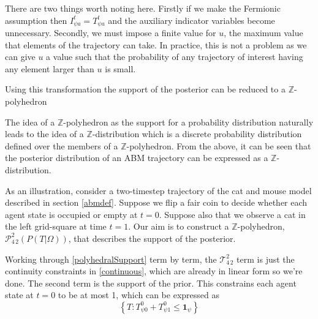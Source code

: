 \documentclass{article}
\begin{document}
There are two things worth noting here. Firstly if we make the Fermionic assumption then $I^t_{\psi a} = T^t_{\psi a}$ and the auxiliary indicator variables become unnecessary. Secondly, we must impose a finite value for $u$, the maximum value that elements of the trajectory can take. In practice, this is not a problem as we can give $u$ a value such that the probability of any trajectory of interest having any element larger than $u$ is small.

Using this transformation the support of the posterior can be reduced to a $\mathbb{Z}$-polyhedron

The idea of a $\mathbb{Z}$-polyhedron as the support for a probability distribution naturally leads to the idea of a $\mathbb{Z}$-distribution which is a discrete probability distribution defined over the members of a $\mathbb{Z}$-polyhedron. From the above, it can be seen that the posterior distribution of an ABM trajectory can be expressed as a $\mathbb{Z}$-distribution.

As an illustration, consider a two-timestep trajectory of the cat and mouse model described in section \ref{abmdef}. Suppose we flip a fair coin to decide whether each agent state is occupied or empty at $t=0$. Suppose also that we observe a cat in the left grid-square at time $t=1$. Our aim is to construct a $\mathbb{Z}$-polyhedron, $\mathcal{P}^2_{4\,2}(P(T|\Omega))$, that describes the support of the posterior.

Working through \eqref{polyhedralSupport} term by term, the $\mathcal{T}^2_{4\,2}$ term is just the continuity constraints in \eqref{continuous}, which are already in linear form so we're done. The second term is the support of the prior. This constrains each agent state at $t=0$ to be at most 1, which can be expressed as
\[
\left\{T:T^0_{\psi 0} + T^0_{\psi 1} \le \mathbf{1}_{\psi}\right\}
\]
\end{document}
